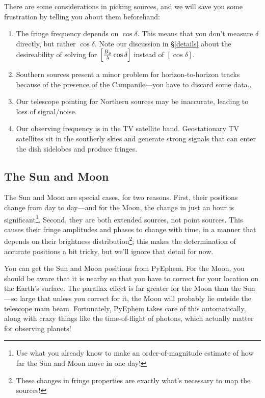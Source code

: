 \documentclass[11pt,preprint]{aastex}
\begin{document}
	There are some considerations in picking sources, and we will
save you some frustration by telling you about them beforehand:
\begin{enumerate}


	\item The fringe frequency depends on $\cos \delta$. This means
that you don't measure $\delta$ directly, but rather $\cos \delta$. Note
our discussion in \S\ref{details} about the desireability of solving for
$\left[{B_y \over \lambda}\cos \delta \right]$ instead of $[\cos{\delta}]$.

	\item Southern sources present a minor problem for
horizon-to-horizon tracks because of the presence of the Campanile---you
have to discard some data..

	\item Our telescope pointing for Northern sources may be
inaccurate, leading to loss of signal/noise. 

	\item Our observing frequency is in the TV satellite band. 
Geostationary TV satellites sit in the southerly skies and generate
strong signals that can enter the dish sidelobes and produce fringes. 

\end{enumerate}

\subsection{The Sun and Moon}

	The Sun and Moon are special cases, for two reasons. First, 
their positions change from day to day---and for the Moon, the change in
just an hour is significant\footnote{Use what you already know to make
an order-of-magnitude estimate of how far the Sun and Moon move in one
day!}.  Second, they are both extended sources, not point sources. This
causes their fringe amplitudes and phases to change with time, in a
manner that depends on their brightness distribution\footnote{These
changes in fringe properties are exactly what's necessary to map the
sources!}; this makes the determination of accurate positions a bit
tricky, but we'll ignore that detail for now.

	You can get the Sun and Moon positions from PyEphem.
For the Moon, you should be aware that it
is nearby so that you have to correct for your location on the Earth's
surface. The parallax effect is far greater for the Moon than the
Sun---so large that unless you correct for it, the Moon will probably
lie outside the telescope main beam. Fortunately, PyEphem takes care of this
automatically, along with crazy things like the time-of-flight of photons,
which actually matter for observing planets!
\end{document}
